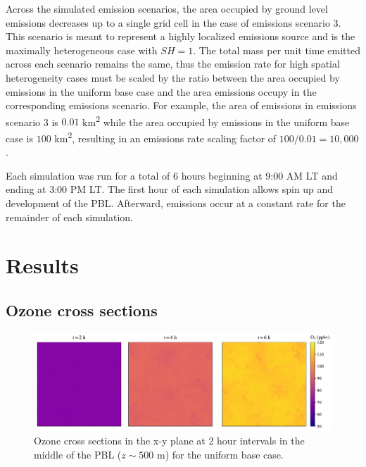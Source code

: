 Across the simulated emission scenarios, the area occupied by ground level emissions decreases up to a single grid cell in the case of emissions scenario 3. This scenario is meant to represent a highly localized emissions source and is the maximally heterogeneous case with $SH=1$. The total mass per unit time emitted across each scenario remains the same, thus the emission rate for high spatial heterogeneity cases must be scaled by the ratio between the area occupied by emissions in the uniform base case and the area emissions occupy in the corresponding emissions scenario. For example, the area of emissions in emissions scenario 3 is $0.01$ \si{km^2} while the area occupied by emissions in the uniform base case is  $100$ \si{km^2}, resulting in an emissions rate scaling factor of $100/0.01 = 10,000$. 

Each simulation was run for a total of 6 hours beginning at 9:00 AM LT and ending at 3:00 PM LT. The first hour of each simulation allows spin up and development of the PBL. Afterward, emissions occur at a constant rate for the remainder of each simulation.

\section{Results}


\subsection{Ozone cross sections}

\begin{figure}[h]
    \centering
    \includegraphics[width=\textwidth]{figures/chapter4/o3-crosssec-uniform-basecase-z25.pdf}
    \caption{Ozone cross sections in the x-y plane at 2 hour intervals in the middle of the PBL ($z\sim500$ \si{m}) for the uniform base case.}
    \label{fig:o3-crosssec-ub}
  \end{figure}


